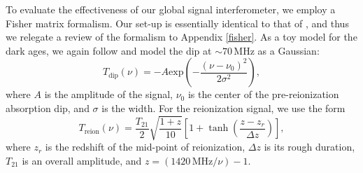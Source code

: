\documentclass[twocolumn,apj,numberedappendix]{emulateapj}
\begin{document}
To evaluate the effectiveness of our global signal interferometer, we employ a Fisher matrix formalism. Our set-up is essentially identical to that of \citet{BernardiLEDA}, and thus we relegate a review of the formalism to Appendix \ref{fisher}. As a toy model for the dark ages, we again follow \citet{BernardiLEDA} and model the dip at $\sim 70\,\textrm{MHz}$ as a Gaussian:
\begin{equation}
\label{eq:Dip}
T_\textrm{dip}(\nu) = -A \textrm{exp}\left ( -\frac{(\nu - \nu_0)^2}{2\sigma^2} \right ),
\end{equation}
where $A$ is the amplitude of the signal, $\nu_0$ is the center of the pre-reionization absorption dip, and $\sigma$ is the width. For the reionization signal, we use the form
\begin{equation}
\label{eq:Step}
T_\textrm{reion}(\nu) = \frac{T_{21}}{2} \sqrt{\frac{1+z}{10}}\left[ 1 +  \tanh \left( \frac{z-z_r}{\Delta z} \right)\right],
\end{equation}
where $z_r$ is the redshift of the mid-point of reionization, $\Delta z$ is its rough duration, $T_{21}$ is an overall amplitude, and $z = (1420 \,\textrm{MHz} / \nu) - 1$.
\end{document}
